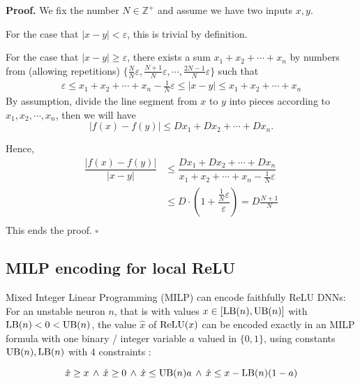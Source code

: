 	\textbf{Proof.}
	We fix the number $N\in\mathbb{Z}^+$ and assume we have two inputs $x, y$.
	
	For the case that $|x-y|<\varepsilon$, this is trivial by definition.
	
	For the case that $|x-y|\geq \varepsilon$, there exists a sum $x_1+x_2+\cdots+x_n$ by numbers from (allowing repetitions) $\{\frac{N}{N}\varepsilon,\frac{N+1}{N}\varepsilon,\cdots, \frac{2N-1}{N}\varepsilon\}$ such that \begin{align*}
		\varepsilon \leq x_1+x_2+\cdots+x_n -\frac{1}{N}\varepsilon \leq |x-y| \leq x_1+x_2+\cdots+x_n
	\end{align*}
	By assumption, divide the line segment from $x$ to $y$ into pieces according to $x_1, x_2,\cdots,x_n$, then we will have $$|f(x)-f(y)|\leq Dx_1+Dx_2+\cdots+Dx_n.$$
	
	Hence,\begin{align*}
		\dfrac{|f(x)-f(y)|}{|x-y|} &\leq \dfrac{Dx_1+Dx_2+\cdots+Dx_n}{x_1+x_2+\cdots+x_n -\frac{1}{N}\varepsilon}\\
		& \leq D\cdot( 1+  \dfrac{\frac{1}{N}\varepsilon}{\varepsilon})= D \frac{N+1}{N}\\
	\end{align*}
	This ends the proof.
	\hfill $\square$
	
	\fi

	
	
	
	
	\subsection{MILP encoding for local ReLU}
	
	Mixed Integer Linear Programming (MILP) can encode faithfully ReLU DNNs:
	For an unstable neuron $n$, that is with values 
    $x \in [\mathrm{LB}(n),\mathrm{UB}(n)]$ with $\mathrm{LB}(n)<0<\mathrm{UB}(n)$, 
    the value $\hat{x}$ of $\mathrm{ReLU}(x)$ can be encoded exactly in an MILP formula with one binary / integer variable $a$ valued in $\{0,1\}$, using constants $\mathrm{UB}(n),\mathrm{LB}(n)$ with 4 constraints \cite{MILP}:
	
	\vspace{-0.4cm}
	\begin{equation} 
        \hat{x} \geq x \, \wedge \, \hat{x} \geq 0 \, \wedge \, \hat{x} \leq \mathrm{UB}(n) a \, \wedge \, \hat{x} \leq x-\mathrm{LB}(n) (1-a)
		\label{eq11}
	\end{equation}
	
